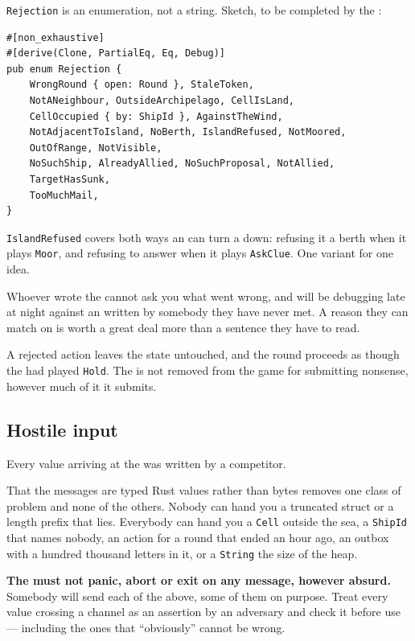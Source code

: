 \documentclass{article}
\begin{document}
\texttt{Rejection} is an enumeration, not a string. Sketch, to be completed by the \WG:

\begin{lstlisting}
#[non_exhaustive]
#[derive(Clone, PartialEq, Eq, Debug)]
pub enum Rejection {
    WrongRound { open: Round }, StaleToken,
    NotANeighbour, OutsideArchipelago, CellIsLand,
    CellOccupied { by: ShipId }, AgainstTheWind,
    NotAdjacentToIsland, NoBerth, IslandRefused, NotMoored,
    OutOfRange, NotVisible,
    NoSuchShip, AlreadyAllied, NoSuchProposal, NotAllied,
    TargetHasSunk,
    TooMuchMail,
}
\end{lstlisting}

\texttt{IslandRefused} covers both ways an \island{} can turn a \ship{} down: refusing it a berth
when it plays \texttt{Moor}, and refusing to answer when it plays \texttt{AskClue}. One variant
for one idea.

Whoever wrote the \ship{} cannot ask you what went wrong, and will be debugging late at night
against an \admiralty{} written by somebody they have never met. A reason they can match on is
worth a great deal more than a sentence they have to read.

A rejected action leaves the state untouched, and the round proceeds as though the \ship{} had
played \texttt{Hold}. The \ship{} is not removed from the game for submitting nonsense, however
much of it it submits.

\subsection{Hostile input}

Every value arriving at the \admiralty{} was written by a competitor.

That the messages are typed Rust values rather than bytes removes one class of problem and none of
the others. Nobody can hand you a truncated struct or a length prefix that lies. Everybody can hand
you a \texttt{Cell} outside the sea, a \texttt{ShipId} that names nobody, an action for a round
that ended an hour ago, an outbox with a hundred thousand letters in it, or a \texttt{String} the
size of the heap.

\textbf{The \admiralty{} must not panic, abort or exit on any message, however absurd.} Somebody
will send each of the above, some of them on purpose. Treat every value crossing a channel as an
assertion by an adversary and check it before use --- including the ones that ``obviously'' cannot
be wrong.
\end{document}
